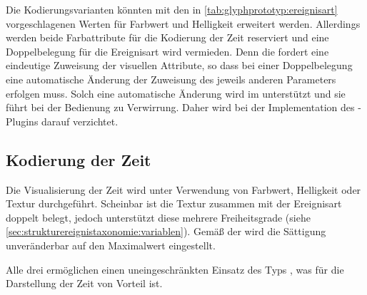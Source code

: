 Die Kodierungsvarianten könnten mit den in \autoref{tab:glyphprototyp:ereignisart} vorgeschlagenen Werten für Farbwert und Helligkeit erweitert werden. Allerdings werden beide Farbattribute für die Kodierung der Zeit reserviert und eine Doppelbelegung für die Ereignisart wird vermieden. Denn die  fordert eine eindeutige Zuweisung der visuellen Attribute, so dass bei einer Doppelbelegung eine automatische Änderung der Zuweisung des jeweils anderen Parameters erfolgen muss. Solch eine automatische Änderung wird im  unterstützt und sie führt bei der Bedienung zu Verwirrung. Daher wird bei der Implementation des -Plugins darauf verzichtet.

\subsection*{Kodierung der Zeit}\label{sec:vis:glyh-zeit}
Die Visualisierung der Zeit wird unter Verwendung von Farbwert, Helligkeit oder Textur durchgeführt. Scheinbar ist die Textur zusammen mit der Ereignisart doppelt belegt, jedoch unterstützt diese  mehrere Freiheitsgrade (siehe \autoref{sec:strukturereignistaxonomie:variablen}). Gemäß der  wird die Sättigung unveränderbar auf den Maximalwert eingestellt.

Alle drei  ermöglichen einen uneingeschränkten Einsatz des Typs , was für die Darstellung der Zeit von Vorteil ist.

